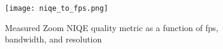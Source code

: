 
\begin{figure}
    \centering
    \texttt{[image: niqe\_to\_fps.png]}
    \caption{Measured Zoom NIQE quality metric as a function of fps, bandwidth, and resolution}
    \label{fig:niqe-fps-bw-res}
\end{figure}
